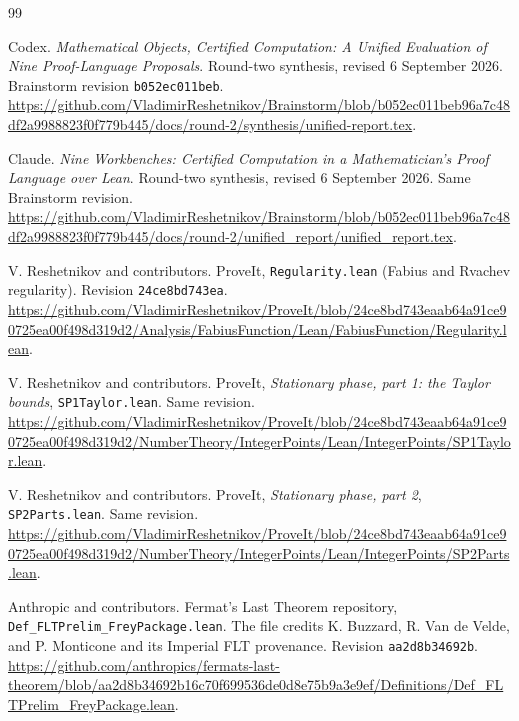 \documentclass[11pt,a4paper]{article}
\theoremstyle{definition}
\theoremstyle{remark}
\newcommand{\code}[1]{\texttt{#1}}
\begin{document}
\begin{thebibliography}{99}
\small\raggedright

 Codex. \emph{Mathematical Objects, Certified Computation: A Unified Evaluation of Nine Proof-Language Proposals}. Round-two synthesis, revised 6 September 2026. Brainstorm revision \code{b052ec011beb}.\newline
\url{https://github.com/VladimirReshetnikov/Brainstorm/blob/b052ec011beb96a7c48df2a9988823f0f779b445/docs/round-2/synthesis/unified-report.tex}.

 Claude. \emph{Nine Workbenches: Certified Computation in a Mathematician's Proof Language over Lean}. Round-two synthesis, revised 6 September 2026. Same Brainstorm revision.\newline
\url{https://github.com/VladimirReshetnikov/Brainstorm/blob/b052ec011beb96a7c48df2a9988823f0f779b445/docs/round-2/unified_report/unified_report.tex}.

 V. Reshetnikov and contributors. ProveIt, \code{Regularity.lean} (Fabius and Rvachev regularity). Revision \code{24ce8bd743ea}.\newline
\url{https://github.com/VladimirReshetnikov/ProveIt/blob/24ce8bd743eaab64a91ce90725ea00f498d319d2/Analysis/FabiusFunction/Lean/FabiusFunction/Regularity.lean}.

 V. Reshetnikov and contributors. ProveIt, \emph{Stationary phase, part 1: the Taylor bounds}, \code{SP1Taylor.lean}. Same revision.\newline
\url{https://github.com/VladimirReshetnikov/ProveIt/blob/24ce8bd743eaab64a91ce90725ea00f498d319d2/NumberTheory/IntegerPoints/Lean/IntegerPoints/SP1Taylor.lean}.

 V. Reshetnikov and contributors. ProveIt, \emph{Stationary phase, part 2}, \code{SP2Parts.lean}. Same revision.\newline
\url{https://github.com/VladimirReshetnikov/ProveIt/blob/24ce8bd743eaab64a91ce90725ea00f498d319d2/NumberTheory/IntegerPoints/Lean/IntegerPoints/SP2Parts.lean}.

 Anthropic and contributors. Fermat's Last Theorem repository, \code{Def\_FLTPrelim\_FreyPackage.lean}. The file credits K. Buzzard, R. Van de Velde, and P. Monticone and its Imperial FLT provenance. Revision \code{aa2d8b34692b}.\newline
\url{https://github.com/anthropics/fermats-last-theorem/blob/aa2d8b34692b16c70f699536de0d8e75b9a3e9ef/Definitions/Def_FLTPrelim_FreyPackage.lean}.


\end{thebibliography}
\end{document}
